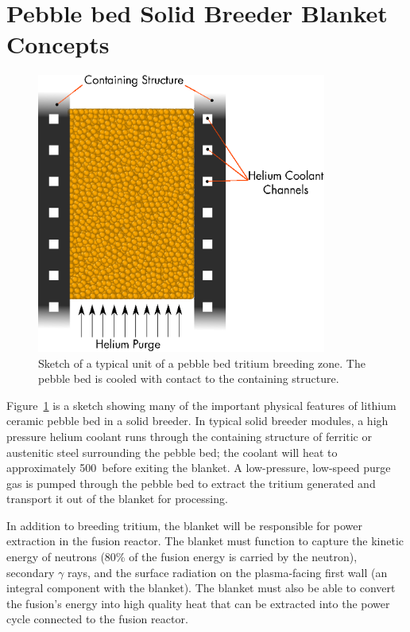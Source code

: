 \section{Pebble bed Solid Breeder Blanket Concepts}\label{sec:blanket-design}

\begin{figure}
	\centering
	\includegraphics[width=0.85\textwidth]{chapters/figures/solid_breeder_sketch} 
	\caption{Sketch of a typical unit of a pebble bed tritium breeding zone. The pebble bed is cooled with contact to the containing structure.}
	\label{fig:solid-breeder-sketch}
\end{figure}

Figure~\ref{fig:solid-breeder-sketch} is a sketch showing many of the important physical features of lithium ceramic pebble bed in a solid breeder. In typical solid breeder modules, a high pressure helium coolant runs through the containing structure of ferritic or austenitic steel surrounding the pebble bed; the coolant will heat to approximately 500~\celsius before exiting the blanket. A low-pressure, low-speed purge gas is pumped through the pebble bed to extract the tritium generated and transport it out of the blanket for processing. 

In addition to breeding tritium, the blanket will be responsible for power extraction in the fusion reactor. The blanket must function to capture the kinetic energy of neutrons (80\% of the fusion energy is carried by the neutron), secondary $\gamma$ rays, and the surface radiation on the plasma-facing first wall (an integral component with the blanket). The blanket must also be able to convert the fusion's energy into high quality heat that can be extracted into the power cycle connected to the fusion reactor. 

